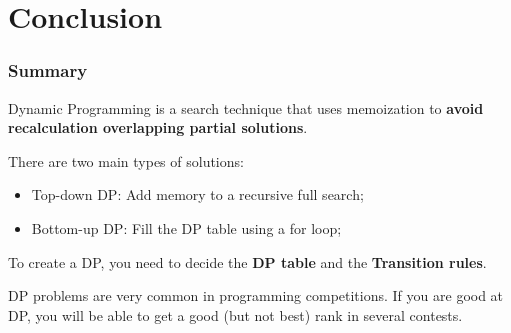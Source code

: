 \section{Conclusion}
\begin{frame}
   \frametitle{Summary}

   Dynamic Programming is a search technique that uses memoization to {\bf avoid recalculation overlapping partial solutions}.\bigskip

   There are two main types of solutions:
   \begin{itemize}
   \item \alert{Top-down DP}: Add memory to a recursive full search;
   \item \alert{Bottom-up DP}: Fill the DP table using a for loop;
   \end{itemize}
   \bigskip

   To create a DP, you need to decide the {\bf DP table} and the {\bf Transition rules}.
   \bigskip

   \begin{block}{}
     DP problems are very common in programming competitions. If you are good at DP, you will be able to get a good (but not best) rank in several contests.
   \end{block}
\end{frame}


